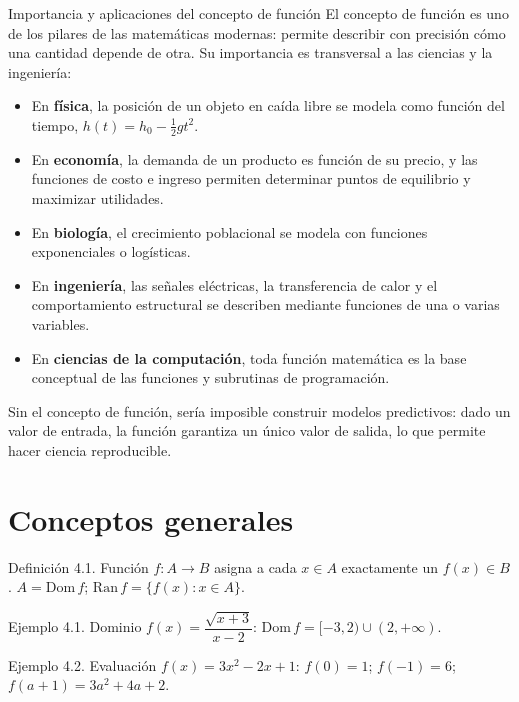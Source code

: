 \documentclass[12pt,letterpaper]{book}
\begin{document}
\begin{histbox}{Importancia y aplicaciones del concepto de función}
El concepto de función es uno de los pilares de las matemáticas modernas: permite describir con precisión cómo una cantidad depende de otra. Su importancia es transversal a las ciencias y la ingeniería:
\begin{itemize}
\item En \textbf{física}, la posición de un objeto en caída libre se modela como función del tiempo, $h(t)=h_0-\tfrac12gt^2$.
\item En \textbf{economía}, la demanda de un producto es función de su precio, y las funciones de costo e ingreso permiten determinar puntos de equilibrio y maximizar utilidades.
\item En \textbf{biología}, el crecimiento poblacional se modela con funciones exponenciales o logísticas.
\item En \textbf{ingeniería}, las señales eléctricas, la transferencia de calor y el comportamiento estructural se describen mediante funciones de una o varias variables.
\item En \textbf{ciencias de la computación}, toda función matemática es la base conceptual de las funciones y subrutinas de programación.
\end{itemize}
Sin el concepto de función, sería imposible construir modelos predictivos: dado un valor de entrada, la función garantiza un único valor de salida, lo que permite hacer ciencia reproducible.
\end{histbox}

\section{Conceptos generales}

\begin{defbox}{Definición 4.1. Función}
$f:A\to B$ asigna a cada $x\in A$ exactamente un $f(x)\in B$. $A=\mathrm{Dom}\,f$; $\mathrm{Ran}\,f=\{f(x):x\in A\}$.
\end{defbox}

\begin{ejbox}{Ejemplo 4.1. Dominio}
$f(x)=\dfrac{\sqrt{x+3}}{x-2}$: $\mathrm{Dom}\,f=[-3,2)\cup(2,+\infty)$.
\end{ejbox}

\begin{ejbox}{Ejemplo 4.2. Evaluación}
$f(x)=3x^2-2x+1$: $f(0)=1$; $f(-1)=6$; $f(a+1)=3a^2+4a+2$.
\end{ejbox}
\end{document}
